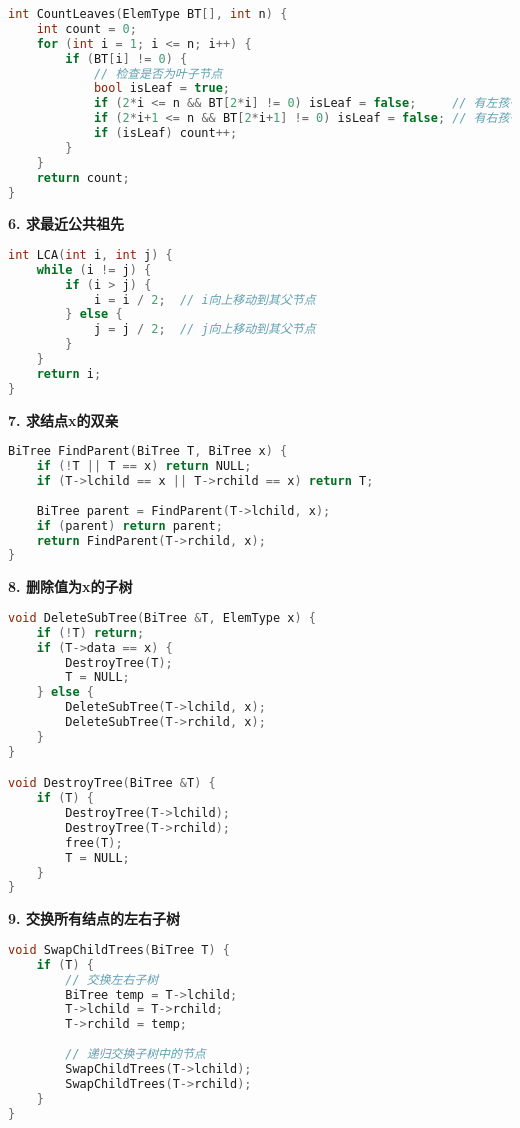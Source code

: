 \documentclass[12pt,a4paper]{amsart}
\begin{document}
\begin{lstlisting}[language=C++]
int CountLeaves(ElemType BT[], int n) {
    int count = 0;
    for (int i = 1; i <= n; i++) {
        if (BT[i] != 0) {
            // 检查是否为叶子节点
            bool isLeaf = true;
            if (2*i <= n && BT[2*i] != 0) isLeaf = false;     // 有左孩子
            if (2*i+1 <= n && BT[2*i+1] != 0) isLeaf = false; // 有右孩子
            if (isLeaf) count++;
        }
    }
    return count;
}
\end{lstlisting}

\textbf{6. 求最近公共祖先}

\begin{lstlisting}[language=C++]
int LCA(int i, int j) {
    while (i != j) {
        if (i > j) {
            i = i / 2;  // i向上移动到其父节点
        } else {
            j = j / 2;  // j向上移动到其父节点
        }
    }
    return i;
}
\end{lstlisting}

\textbf{7. 求结点x的双亲}

\begin{lstlisting}[language=C++]
BiTree FindParent(BiTree T, BiTree x) {
    if (!T || T == x) return NULL;
    if (T->lchild == x || T->rchild == x) return T;
    
    BiTree parent = FindParent(T->lchild, x);
    if (parent) return parent;
    return FindParent(T->rchild, x);
}
\end{lstlisting}

\textbf{8. 删除值为x的子树}

\begin{lstlisting}[language=C++]
void DeleteSubTree(BiTree &T, ElemType x) {
    if (!T) return;
    if (T->data == x) {
        DestroyTree(T);
        T = NULL;
    } else {
        DeleteSubTree(T->lchild, x);
        DeleteSubTree(T->rchild, x);
    }
}

void DestroyTree(BiTree &T) {
    if (T) {
        DestroyTree(T->lchild);
        DestroyTree(T->rchild);
        free(T);
        T = NULL;
    }
}
\end{lstlisting}

\textbf{9. 交换所有结点的左右子树}

\begin{lstlisting}[language=C++]
void SwapChildTrees(BiTree T) {
    if (T) {
        // 交换左右子树
        BiTree temp = T->lchild;
        T->lchild = T->rchild;
        T->rchild = temp;
        
        // 递归交换子树中的节点
        SwapChildTrees(T->lchild);
        SwapChildTrees(T->rchild);
    }
}
\end{lstlisting}
\end{document}
